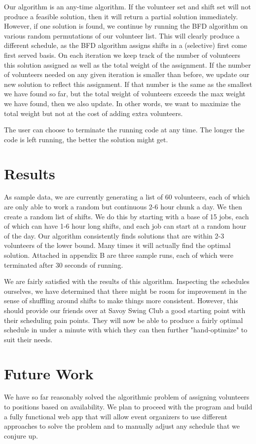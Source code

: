 \documentclass[11pt]{article}
\theoremstyle{definition}
\begin{document}
\begin{multicols}{2}
Our algorithm is an any-time algorithm.
If the volunteer set and shift set will not produce a feasible solution, then it will return a partial solution immediately.
However, if one solution is found, we continue by running the BFD algorithm on various random permutations of our volunteer list.
This will clearly produce a different schedule, as the BFD algorithm assigns shifts in a (selective) first come first served basis.
On each iteration we keep track of the number of volunteers this solution assigned as well as the total weight of the assignment.
If the number of volunteers needed on any given iteration is smaller than before, we update our new solution to reflect this assignment.
If that number is the same as the smallest we have found so far, but the total weight of volunteers exceeds the max weight we have found, then we also update.
In other words, we want to maximize the total weight but not at the cost of adding extra volunteers.

The user can choose to terminate the running code at any time.
The longer the code is left running, the better the solution might get.

\section{Results}
As sample data, we are currently generating a list of 60 volunteers, each of which are only able to work a random but continuous 2-6 hour chunk a day. We then create a random list of shifts.
We do this by starting with a base of 15 jobs, each of which can have 1-6 hour long shifts, and each job can start at a random hour of the day. Our algorithm consistently finds solutions that are
within 2-3 volunteers of the lower bound. Many times it will actually find the optimal solution. Attached in appendix B are three sample runs, each of which were terminated after 30 seconds of running.

We are fairly satisfied with the results of this algorithm. Inspecting the schedules ourselves, we have determined that there might be room for improvement in the sense of shuffling around shifts to make 
things more consistent. However, this should provide our friends over at Savoy Swing Club a good starting point with their scheduling pain points. They will now be able to produce a fairly optimal schedule
in under a minute with which they can then further "hand-optimize" to suit their needs. 


\section{Future Work}
We have so far reasonably solved the algorithmic problem of assigning volunteers to positions based on availability.
We plan to proceed with the program and build a fully functional web app that will allow event organizers to use different approaches to solve the problem and to manually adjust any schedule that we conjure up.


\end{multicols}
\end{document}

